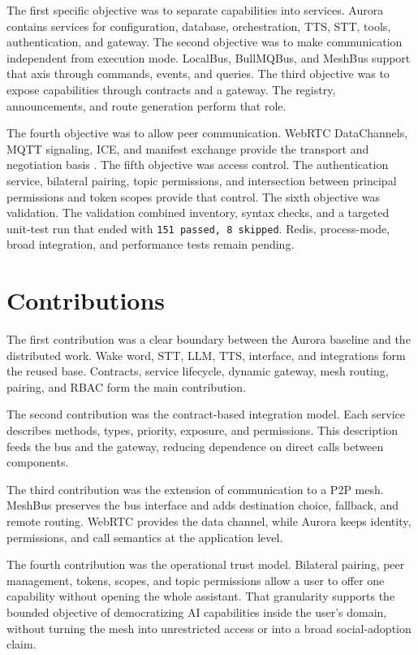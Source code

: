 The first specific objective was to separate capabilities into services. Aurora contains services for configuration, database, orchestration, \gls{TTS}, \gls{STT}, tools, authentication, and gateway. The second objective was to make communication independent from execution mode. LocalBus, BullMQBus, and MeshBus support that axis through commands, events, and queries. The third objective was to expose capabilities through contracts and a gateway. The registry, announcements, and route generation perform that role.

The fourth objective was to allow peer communication. WebRTC DataChannels, MQTT signaling, ICE, and manifest exchange provide the transport and negotiation basis \cite{w3c_webrtc_2025,rfc8831_datachannels,rfc8445_ice,oasis_mqtt_2019}. The fifth objective was access control. The authentication service, bilateral pairing, topic permissions, and intersection between principal permissions and token scopes provide that control. The sixth objective was validation. The validation combined inventory, syntax checks, and a targeted unit-test run that ended with \texttt{151 passed, 8 skipped}. Redis, process-mode, broad integration, and performance tests remain pending.

\section{Contributions}
\label{sec:final-contributions}

The first contribution was a clear boundary between the Aurora baseline and the distributed work. Wake word, STT, LLM, TTS, interface, and integrations form the reused base. Contracts, service lifecycle, dynamic gateway, mesh routing, pairing, and RBAC form the main contribution.

The second contribution was the contract-based integration model. Each service describes methods, types, priority, exposure, and permissions. This description feeds the bus and the gateway, reducing dependence on direct calls between components.

The third contribution was the extension of communication to a P2P mesh. MeshBus preserves the bus interface and adds destination choice, fallback, and remote routing. WebRTC provides the data channel, while Aurora keeps identity, permissions, and call semantics at the application level.

The fourth contribution was the operational trust model. Bilateral pairing, peer management, tokens, scopes, and topic permissions allow a user to offer one capability without opening the whole assistant. That granularity supports the bounded objective of democratizing AI capabilities inside the user's domain, without turning the mesh into unrestricted access or into a broad social-adoption claim.


